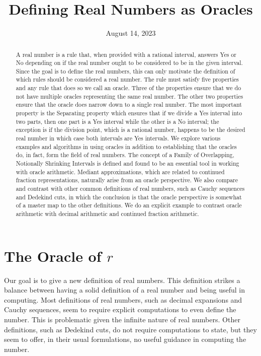 \documentclass[12pt]{article}
\title{Defining Real Numbers as Oracles}
\date{August 14, 2023}
\begin{document}
\maketitle
\begin{abstract}
A real number is a rule that, when provided with a rational interval, answers Yes or No depending on if the real number ought to be considered to be in the given interval. Since the goal is to define the real numbers, this can only motivate the definition of which rules should be considered a real number. The rule must satisfy five properties and any rule that does so we call an oracle. Three of the properties ensure that we do not have multiple oracles representing the same real number. The other two properties ensure that the oracle does narrow down to a single real number. The most important property is the Separating property which ensures that if we divide a Yes interval into two parts, then one part is a Yes interval while the other is a No interval; the exception is if the division point, which is a rational number, happens to be the desired real number in which case both intervals are Yes intervals. We explore various examples and algorithms in using oracles in addition to establishing that the oracles do, in fact, form the field of real numbers. The concept of a Family of Overlapping, Notionally Shrinking Intervals is defined and found to be an essential tool in working with oracle arithmetic. Mediant approximations, which are related to continued fraction representations, naturally arise from an oracle perspective. We also compare and contrast with other common definitions of real numbers, such as Cauchy sequences and Dedekind cuts, in which the conclusion is that the oracle perspective is somewhat of a master map to the other definitions. We do an explicit example to contrast oracle arithmetic with decimal arithmetic and continued fraction arithmetic. 
\end{abstract}

\tableofcontents

\section{The Oracle of \texorpdfstring{$r$}{r}}\label{sec:ora}

Our goal is to give a new definition of real numbers. This definition strikes a balance between having a solid definition of a real number and being useful in computing. Most definitions of real numbers, such as decimal expansions and Cauchy sequences, seem to require explicit computations to even define the number. This is problematic given the infinite nature of real numbers. Other definitions, such as Dedekind cuts, do not require computations to state, but they seem to offer, in their usual formulations, no useful guidance in computing the number. 
\end{document}
